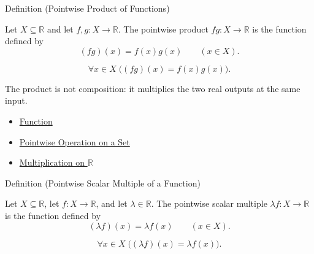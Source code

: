 \begin{definitionbox}{Definition (Pointwise Product of Functions)}
\begin{definition}
\label{def:pointwise-product-of-functions}
Let $X\subseteq\mathbb{R}$ and let $f,g:X\to\mathbb{R}$.  The
pointwise product $fg:X\to\mathbb{R}$ is the function defined by
\[
  (fg)(x)=f(x)g(x)
  \qquad (x\in X).
\]
\end{definition}
\end{definitionbox}

\begin{remark*}
\[
  \forall x\in X\;\bigl((fg)(x)=f(x)g(x)\bigr).
\]
\end{remark*}

\begin{remark*}[Interpretation]
The product is not composition: it multiplies the two real outputs at the
same input.
\end{remark*}

\begin{dependencies}
\begin{itemize}
  \item \hyperref[def:function]{Function}
  \item \hyperref[def:pointwise-operation-on-set]{Pointwise Operation on a Set}
  \item \hyperref[def:multiplication-on-r]{Multiplication on $\mathbb{R}$}
\end{itemize}
\end{dependencies}

\begin{definitionbox}{Definition (Pointwise Scalar Multiple of a Function)}
\begin{definition}
\label{def:pointwise-scalar-multiple-of-a-function}
Let $X\subseteq\mathbb{R}$, let $f:X\to\mathbb{R}$, and let
\(\lambda\in\mathbb{R}\).  The pointwise scalar multiple
\(\lambda f:X\to\mathbb{R}\) is the function defined by
\[
  (\lambda f)(x)=\lambda f(x)
  \qquad (x\in X).
\]
\end{definition}
\end{definitionbox}

\begin{remark*}
\[
  \forall x\in X\;\bigl((\lambda f)(x)=\lambda f(x)\bigr).
\]
\end{remark*}

